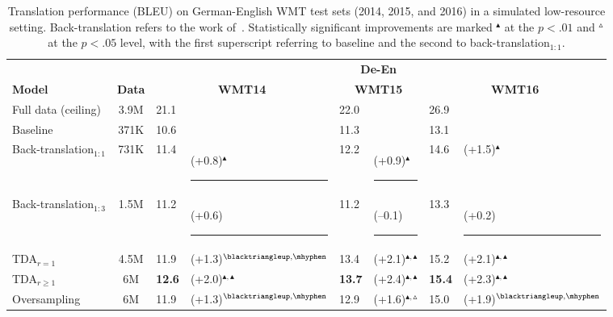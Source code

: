 \newcommand{\sigspace}{\rule{3ex}{0pt}}
\newcommand{\sigspacehalf}{\rule{1.6ex}{0pt}}
\begin{table}
\setlength{\tabcolsep}{5pt}
\centering
\caption{\label{bleuTBdeen} Translation performance (BLEU) on German-English WMT test sets (2014, 2015, and 2016) in a simulated low-resource setting. Back-translation refers to the work of~\citet{sennrich-haddow-birch:2016:P16-11}. 
Statistically significant improvements are marked $^\blacktriangleup$ at the $p < .01$ and $^\smalltriangleup$ at the $p < .05$ level, with the first superscript referring to baseline and the second to back-translation$_{1:1}$.}
\begin{tabular}{lcllllll}
\toprule
\multicolumn{2}{c}{}    & \multicolumn{6}{c}{\textbf{De-En}} \\\cline{3-8}
\rule{0pt}{2.5ex}    \textbf{Model}   & \textbf{Data} &  \multicolumn{2}{c}{\bf WMT14} &  \multicolumn{2}{c}{\bf WMT15} &  \multicolumn{2}{c}{\bf WMT16}\\ \midrule     
Full data (ceiling)  & 3.9M &  21.1 &  & 22.0 & & 26.9  &  \\\midrule
Baseline  & 371K & 10.6 & & 11.3 & & 13.1  & \\
%
Back-translation$_{1:1}$  & 731K & 11.4 & (+0.8)$^{\blacktriangleup}$\sigspacehalf & 12.2 & (+0.9)$^{\blacktriangleup}$\sigspacehalf & 14.6 & (+1.5)$^{\blacktriangleup}$  \\
%
Back-translation$_{1:3}$  & 1.5M & 11.2 & (+0.6)\sigspace & 11.2 & (--0.1)\sigspace & 13.3 & (+0.2)\sigspace \\\midrule
%
TDA$_{r=1}$ & 4.5M  &  11.9 & (+1.3)$^{\blacktriangleup,\mhyphen}$ & 13.4 & (+2.1)$^{\blacktriangleup,\blacktriangleup}$ & 15.2 & (+2.1)$^{\blacktriangleup,\blacktriangleup}$  \\
%
TDA$_{r\ge 1}$ &  6M    &  \textbf{12.6}  & (+2.0)$^{\blacktriangleup,\blacktriangleup}$ & \textbf{13.7} & (+2.4)$^{\blacktriangleup,\blacktriangleup}$ & \textbf{15.4} & (+2.3)$^{\blacktriangleup,\blacktriangleup}$ \\
%
Oversampling & 6M & 11.9 & (+1.3)$^{\blacktriangleup,\mhyphen}$ & 12.9 & (+1.6)$^{\blacktriangleup,\smalltriangleup}$ & 15.0 & (+1.9)$^{\blacktriangleup,\mhyphen}$  \\
\bottomrule
\end{tabular}
\end{table}


